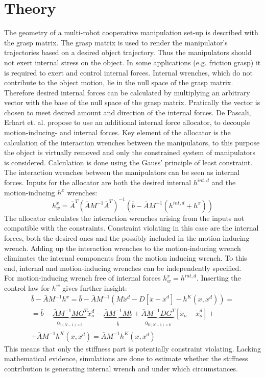 \documentclass[conference]{IEEEtran}
\begin{document}
\section{Theory}
The geometry of a multi-robot cooperative manipulation set-up is described with the grasp matrix. The grasp matrix is used to render the manipulator's trajectories based on a desired object trajectory. Thus the manipulators should not exert internal stress on the object. In some applications (e.g. friction grasp) it is required to exert and control internal forces. Internal wrenches, which do not contribute to the object motion, lie in the null space of the grasp matrix. Therefore desired internal forces can be calculated by multiplying an arbitrary vector with the base of the null space of the grasp matrix. Pratically the vector is chosen to meet desired amount and direction of the internal forces.
De Pascali, Erhart et. al. propose to use an additional internal force allocator, to decouple motion-inducing- and internal forces. Key element of the allocator is the calculation of the interaction wrenches between the manipulators, to this purpose the object is virtually removed and only the constrained system of manipulators is considered. Calculation is done using the Gauss' principle of least constraint. The interaction wrenches between the manipulators can be seen as internal forces. Inputs for the allocator are both the desired internal $ h^{int,d} $ and the motion-inducing $ h^x $ wrenches:
\begin{equation}
h_w^{x} = \bar{A}^T(\bar{A}M^{-1}\bar{A}^T)^{-1}(\bar{b}-\bar{A}M^{-1}(h^{int,d}+h^x))
\end{equation}
The allocator calculates the interaction wrenches arising from the inputs not compatible with the constraints. Constraint violating in this case are the internal forces, both the desired ones and the possibly included in the motion-inducing wrench. Adding up the interaction wrenches to the motion-inducing wrench eliminates the internal components from the motion inducing wrench. To this end, internal and motion-inducing wrenches can be independently specified.\\
For motion-inducing wrench free of internal forces $ h_w^x = h^{int,d} $. Inserting the control law for $ h^w $ gives further insight:
\begin{multline}
\bar{b} - \bar{A}M^{-1}h^x = \bar{b}-\bar{A}M^{-1}(M\ddot{x}^d - D[\dot{x}-\dot{x}^d] - h^K(x,x^d)) =\\
= \bar{b} - \underbrace{\bar{A}M^{-1}MG^T}_{\substack{0_{6(N-1)\times6}}}\ddot{x}_o^d -\underbrace{\bar{A}M^{-1}Mb}_{\substack{\bar{b}}} + \underbrace{\bar{A}M^{-1}DG^T}_{\substack{0_{6(N-1)\times6}}}[\dot{x}_o - \dot{x}_o^d] + \\
+ \bar{A}M^{-1}h^K(x,x^d) = \bar{A}M^{-1}h^K(x,x^d) 
\end{multline}
This means that only the stiffness part is potentially constraint violating. Lacking mathematical evidence, simulations are done to estimate whether the stiffness contribution is generating internal wrench and under which circumstances. 
\end{document}
